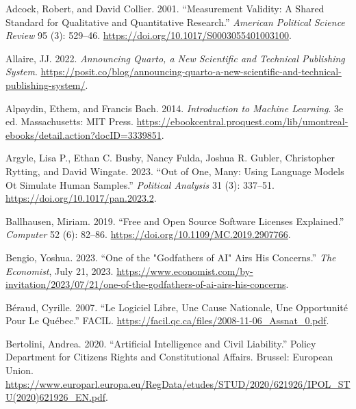 \documentclass[
  letterpaper,
]{scrbook}
\newlength{\cslhangindent}
\newlength{\cslentryspacingunit} %
\newenvironment{CSLReferences}[2] %
 {%
  \setlength{\parindent}{0pt}
  \ifodd #1
  \let\oldpar\par
  \def\par{\hangindent=\cslhangindent\oldpar}
  \fi
  \setlength{\parskip}{#2\cslentryspacingunit}
 }%
 {}
\begin{document}
\hypertarget{refs}{}
\begin{CSLReferences}{1}{0}
\leavevmode{}%
Adcock, Robert, and David Collier. 2001. {``Measurement {Validity}: {A
Shared Standard} for {Qualitative} and {Quantitative Research}.''}
\emph{American Political Science Review} 95 (3): 529--46.
\url{https://doi.org/10.1017/S0003055401003100}.

\leavevmode{}%
Allaire, JJ. 2022. \emph{Announcing {Quarto}, a New Scientific and
Technical Publishing System}.
\url{https://posit.co/blog/announcing-quarto-a-new-scientific-and-technical-publishing-system/}.

\leavevmode{}%
Alpaydin, Ethem, and Francis Bach. 2014. \emph{Introduction to {Machine
Learning}}. 3e ed. Massachusetts: MIT Press.
\url{https://ebookcentral.proquest.com/lib/umontreal-ebooks/detail.action?docID=3339851}.

\leavevmode{}%
Argyle, Lisa P., Ethan C. Busby, Nancy Fulda, Joshua R. Gubler,
Christopher Rytting, and David Wingate. 2023. {``Out of {One}, {Many}:
{Using Language Models} Ot {Simulate Human Samples}.''} \emph{Political
Analysis} 31 (3): 337--51. \url{https://doi.org/10.1017/pan.2023.2}.

\leavevmode{}%
Ballhausen, Miriam. 2019. {``Free and {Open Source Software Licenses
Explained}.''} \emph{Computer} 52 (6): 82--86.
\url{https://doi.org/10.1109/MC.2019.2907766}.

\leavevmode{}%
Bengio, Yoshua. 2023. {``One of the "Godfathers of {AI}" Airs His
Concerns.''} \emph{The Economist}, July 21, 2023.
\url{https://www.economist.com/by-invitation/2023/07/21/one-of-the-godfathers-of-ai-airs-his-concerns}.

\leavevmode{}%
Béraud, Cyrille. 2007. {``Le Logiciel Libre, Une Cause Nationale, Une
Opportunité Pour Le {Québec}.''} FACIL.
\url{https://facil.qc.ca/files/2008-11-06_Assnat_0.pdf}.

\leavevmode{}%
Bertolini, Andrea. 2020. {``Artificial {Intelligence} and {Civil
Liability}.''} Policy Department for Citizen\textquotesingle s Rights
and Constitutional Affairs. Brussel: European Union.
\url{https://www.europarl.europa.eu/RegData/etudes/STUD/2020/621926/IPOL_STU(2020)621926_EN.pdf}.


\end{CSLReferences}
\end{document}
